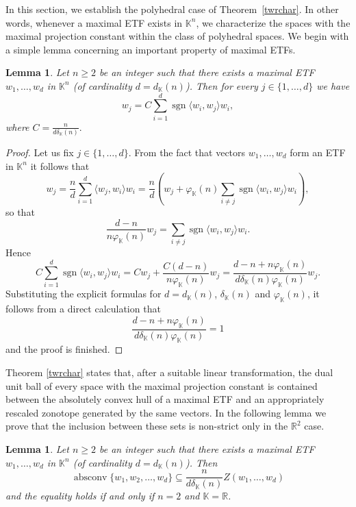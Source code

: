 \documentclass[12pt, reqno]{amsart}
\newtheorem{lem}[twr]{Lemma}
\theoremstyle{definition}
\theoremstyle{remark}
\numberwithin{equation}{section}
\DeclareMathOperator{\absconv}{absconv}
\DeclareMathOperator{\sgn}{sgn}
\begin{document}
In this section, we establish the polyhedral case of Theorem~\ref{twrchar}. In other words, whenever a maximal ETF exists in $\mathbb{K}^n$, we characterize the spaces with the maximal projection constant within the class of polyhedral spaces. We begin with a simple lemma concerning an important property of maximal ETFs.

\begin{lem}
\label{lemwj}
Let $n\ge2$ be an integer such that there exists a maximal ETF $w_1,\ldots,w_d$ in $\mathbb K^n$ (of cardinality $d=d_{\mathbb K}(n)$). Then for every $j\in\{1,\ldots,d\}$ we have
$$w_j = C \sum_{i=1}^{d} \sgn \langle w_i, w_j \rangle w_i,$$
where $C=\frac{n}{d\delta_{\mathbb{K}}(n)}.$
\end{lem}

\begin{proof}
Let us fix $j \in \{1, \ldots, d\}$. From the fact that vectors $w_1, \ldots, w_d$ form an ETF in $\mathbb{K}^n$ it follows that
$$w_j = \frac{n}{d} \sum_{i=1}^{d} \langle w_j, w_i \rangle w_i = \frac{n}{d} \left ( w_j + \varphi_{\mathbb{K}}(n) \sum_{i \neq j} \sgn \langle w_i, w_j \rangle w_i \right ),$$
so that
$$\frac{d-n}{n\varphi_{\mathbb{K}}(n) }w_j =  \sum_{i \neq j} \sgn \langle w_i, w_j \rangle w_i.$$
Hence
$$C \sum_{i=1}^{d} \sgn \langle w_i, w_j \rangle w_i = Cw_j + \frac{C(d-n)}{n\varphi_{\mathbb{K}}(n)} w_j = \frac{d - n + n \varphi_{\mathbb{K}}(n) }{ d \delta_{\mathbb{K}}(n) \varphi_{\mathbb{K}}(n) } w_j.$$
Substituting the explicit formulas for $d=d_{\mathbb{K}}(n)$, $\delta_{\mathbb{K}}(n)$ and $\varphi_{\mathbb{K}}(n)$, it follows from a direct calculation that
$$\frac{d - n + n \varphi_{\mathbb{K}}(n) }{ d \delta_{\mathbb{K}}(n) \varphi_{\mathbb{K}}(n) }  = 1$$
and the proof is finished.
\end{proof}

Theorem \ref{twrchar} states that, after a suitable linear transformation, the dual unit ball of every space with the maximal projection constant is contained between the absolutely convex hull of a maximal ETF and an appropriately rescaled zonotope generated by the same vectors. In the following lemma we prove that the inclusion between these sets is non-strict only in the $\mathbb{R}^2$ case.

\begin{lem}
\label{lemincl}
Let $n \geq 2$ be an integer such that there exists a maximal ETF $w_1, \ldots, w_d$ in $\mathbb{K}^n$ (of cardinality $d = d_{\mathbb{K}}(n)$). Then
$$\absconv \{w_1, w_2, \ldots, w_d\} \subseteq \frac{n}{d\delta_{\mathbb{K}}(n)} Z(w_1, \ldots, w_d)$$
and the equality holds if and only if $n=2$ and $\mathbb{K}=\mathbb{R}$.
\end{lem}
\end{document}
